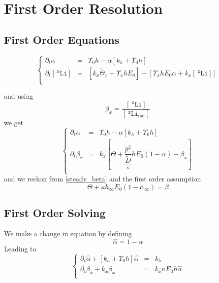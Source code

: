 \documentclass[aps,onecolumn,12pt]{revtex4}
\newcommand{\mychem}[1]{\mathtt{#1}}
\newcommand{\myconc}[1]{\left\lbrack{#1}\right\rbrack}
\newcommand{\spLi}[1]{{~^{\mychem{#1}}\mychem{Li}}}
\newcommand{\Li}[1]{\myconc{\spLi{#1}}}
\newcommand{\spLiOut}[1]{{\spLi{#1}}_{\mathrm{out}}}
\newcommand{\LiOut}[1]{\myconc{\spLiOut{#1}}}
\begin{document}
\section{First Order Resolution}

\subsection{First Order Equations}

\begin{equation}
\left\lbrace
\begin{array}{rcl}
\partial_t \alpha & = & \Upsilon_0 h - \alpha\left\lbrack k_h+\Upsilon_0 h  \right\rbrack\\
\partial_t\Li{x} & = & \left\lbrack k_x\tilde{\Theta}_x+\Upsilon_x h  E_0\right\rbrack
		-\left\lbrack
			\Upsilon_x h  E_0\alpha +  k_x\Li{x}  %
		\right\rbrack\\
\end{array}
\right.
\end{equation}

and using 
\begin{equation}
	\beta_x = \dfrac{\Li{x}}{\LiOut{x}}
\end{equation}
we get
\begin{equation}
\left\lbrace
\begin{array}{rcl}
\partial_t \alpha & = & \Upsilon_0 h - \alpha\left\lbrack k_h+\Upsilon_0 h  \right\rbrack\\
\partial_t\beta_x & = & k_x \left\lbrack
{\Theta + \underbrace{\dfrac{\bar{p}^2}{\tilde{D}}}_{\kappa} h E_0  \left(1-\alpha\right)}
- \beta_x
\right\rbrack \\
\end{array}
\right.
\end{equation}
and we reckon from \eqref{steady_beta} and the first order assumption
\begin{equation}
	\Theta + \kappa h_\infty E_0  \left(1-\alpha_\infty\right) = \beta 
\end{equation}

\subsection{First Order Solving}

We make a change in equation by defining
\begin{equation}
	\hat{\alpha} = 1-\alpha
\end{equation}
Leading to
\begin{equation}
\displaystyle
\left\lbrace
\begin{array}{rcl}
\partial_t \hat\alpha + \left\lbrack k_h+\Upsilon_0 h  \right\rbrack \hat{\alpha} & = & k_h\\
\partial_t \beta_x + k_x \beta_x & = & k_x \kappa E_0 h \hat\alpha \\
\end{array}
\right.
\end{equation}
\end{document}
